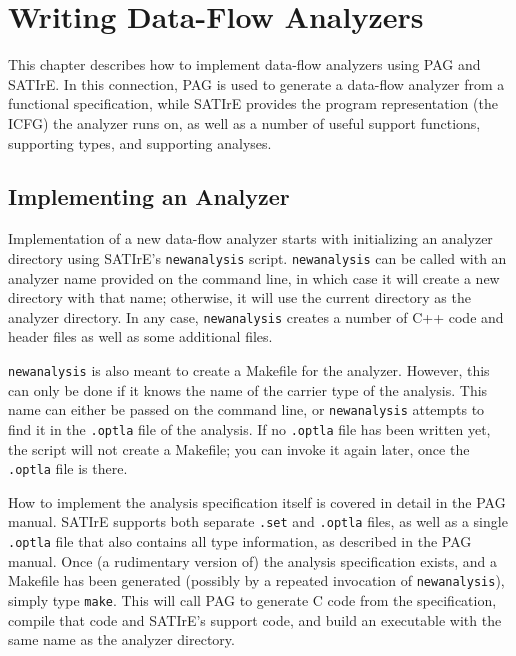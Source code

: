 \documentclass[a4paper,12pt]{report}
\begin{document}
\chapter{Writing Data-Flow Analyzers}
\label{chap:data_flow}

This chapter describes how to implement data-flow analyzers using PAG and
SATIrE. In this connection, PAG is used to generate a data-flow analyzer
from a functional specification, while SATIrE provides the program
representation (the ICFG) the analyzer runs on, as well as a number of
useful support functions, supporting types, and supporting analyses.

\section{Implementing an Analyzer}
\label{sec:pag_analyzer}

Implementation of a new data-flow analyzer starts with initializing an
analyzer directory using SATIrE's \texttt{newanalysis} script.
\texttt{newanalysis} can be called with an analyzer name provided on the
command line, in which case it will create a new directory with that name;
otherwise, it will use the current directory as the analyzer directory. In
any case, \texttt{newanalysis} creates a number of C++ code and header files
as well as some additional files.

\texttt{newanalysis} is also meant to create a Makefile for the analyzer.
However, this can only be done if it knows the name of the carrier type of
the analysis. This name can either be passed on the command line, or
\texttt{newanalysis} attempts to find it in the \texttt{.optla} file of the
analysis. If no \texttt{.optla} file has been written yet, the script will
not create a Makefile; you can invoke it again later, once the
\texttt{.optla} file is there.

How to implement the analysis specification itself is covered in detail in
the PAG manual. SATIrE supports both separate \texttt{.set} and
\texttt{.optla} files, as well as a single \texttt{.optla} file that also
contains all type information, as described in the PAG manual. Once (a
rudimentary version of) the analysis specification exists, and a Makefile
has been generated (possibly by a repeated invocation of
\texttt{newanalysis}), simply type \verb|make|. This will call PAG to
generate C code from the specification, compile that code and SATIrE's
support code, and build an executable with the same name as the analyzer
directory.
\end{document}
